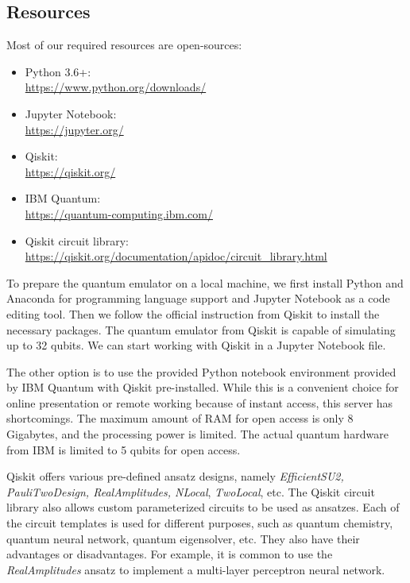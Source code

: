 \subsection{Resources} \label{Resources section}
Most of our required resources are open-sources:
\begin{itemize}
    \item Python 3.6+:\\ \url{https://www.python.org/downloads/}
    \item Jupyter Notebook:\\ \url{https://jupyter.org/}
    \item Qiskit:\\
          \url{https://qiskit.org/}
    \item IBM Quantum:\\ \url{https://quantum-computing.ibm.com/}
    \item Qiskit circuit library:\\ \url{https://qiskit.org/documentation/apidoc/circuit_library.html}
\end{itemize}

To prepare the quantum emulator on a local machine, we first install Python and Anaconda for programming language support and Jupyter Notebook as a code editing tool.
Then we follow the official instruction from Qiskit \cite{Qiskit} to install the necessary packages.
The quantum emulator from Qiskit is capable of simulating up to 32 qubits.
We can start working with Qiskit in a Jupyter Notebook file.

The other option is to use the provided Python notebook environment provided by IBM Quantum with Qiskit pre-installed.
While this is a convenient choice for online presentation or remote working because of instant access, this server has shortcomings.
The maximum amount of RAM for open access is only 8 Gigabytes, and the processing power is limited.
The actual quantum hardware from IBM is limited to 5 qubits for open access.

Qiskit offers various pre-defined ansatz designs, namely \textit{EfficientSU2, PauliTwoDesign, RealAmplitudes, NLocal}, \textit{TwoLocal}, etc.
The Qiskit circuit library also allows custom parameterized circuits to be used as ansatzes.
Each of the circuit templates is used for different purposes, such as quantum chemistry, quantum neural network, quantum eigensolver, etc.
They also have their advantages or disadvantages.
For example, it is common to use the \textit{RealAmplitudes} ansatz to implement a multi-layer perceptron neural network.



